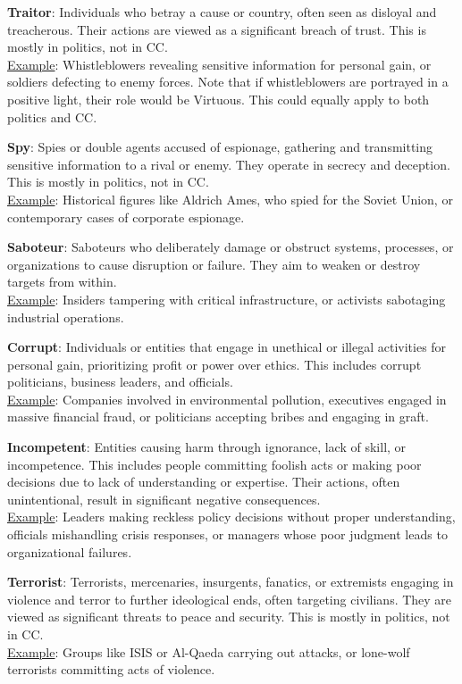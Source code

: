 \textbf{Traitor}: Individuals who betray a cause or country, often seen as disloyal and treacherous. Their actions are viewed as a significant breach of trust. This is mostly in politics, not in CC.
\\\underline{Example}: Whistleblowers revealing sensitive information for personal gain, or soldiers defecting to enemy forces. Note that if whistleblowers are portrayed in a positive light, their role would be Virtuous. This could equally apply to both politics and CC.

\textbf{Spy}: Spies or double agents accused of espionage, gathering and transmitting sensitive information to a rival or enemy. They operate in secrecy and deception. This is mostly in politics, not in CC.
\\\underline{Example}: Historical figures like Aldrich Ames, who spied for the Soviet Union, or contemporary cases of corporate espionage.

\textbf{Saboteur}: Saboteurs who deliberately damage or obstruct systems, processes, or organizations to cause disruption or failure. They aim to weaken or destroy targets from within.
\\\underline{Example}: Insiders tampering with critical infrastructure, or activists sabotaging industrial operations.

\textbf{Corrupt}: Individuals or entities that engage in unethical or illegal activities for personal gain, prioritizing profit or power over ethics. This includes corrupt politicians, business leaders, and officials.
\\\underline{Example}: Companies involved in environmental pollution, executives engaged in massive financial fraud, or politicians accepting bribes and engaging in graft.

\textbf{Incompetent}: Entities causing harm through ignorance, lack of skill, or incompetence. This includes people committing foolish acts or making poor decisions due to lack of understanding or expertise. Their actions, often unintentional, result in significant negative consequences.
\\\underline{Example}: Leaders making reckless policy decisions without proper understanding, officials mishandling crisis responses, or managers whose poor judgment leads to organizational failures.

\textbf{Terrorist}: Terrorists, mercenaries, insurgents, fanatics, or extremists engaging in violence and terror to further ideological ends, often targeting civilians. They are viewed as significant threats to peace and security. This is mostly in politics, not in CC.
\\\underline{Example}: Groups like ISIS or Al-Qaeda carrying out attacks, or lone-wolf terrorists committing acts of violence.

